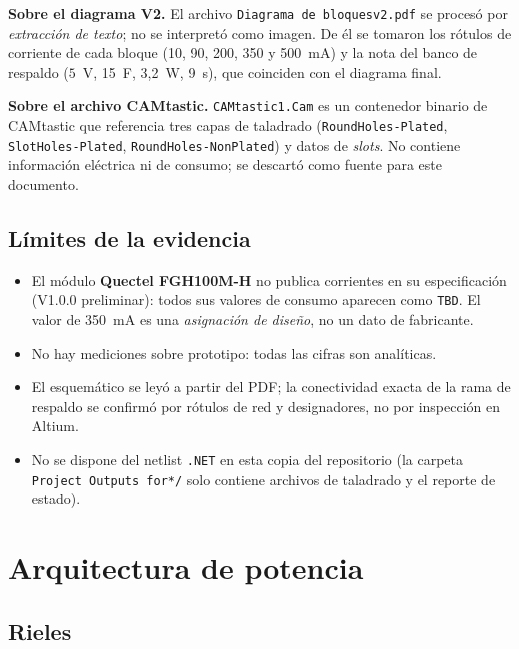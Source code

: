\documentclass[11pt,a4paper]{article}
\begin{document}
\noindent\textbf{Sobre el diagrama V2.} El archivo
\texttt{Diagrama de bloquesv2.pdf} se procesó por \emph{extracción de texto};
no se interpretó como imagen. De él se tomaron los rótulos de corriente de cada
bloque (10, 90, 200, 350 y 500~mA) y la nota del banco de respaldo
($5$~V, 15~F, 3,2~W, 9~s), que coinciden con el diagrama final.

\noindent\textbf{Sobre el archivo CAMtastic.} \texttt{CAMtastic1.Cam} es un
contenedor binario de CAMtastic que referencia tres capas de taladrado
(\texttt{RoundHoles-Plated}, \texttt{SlotHoles-Plated},
\texttt{RoundHoles-NonPlated}) y datos de \emph{slots}. No contiene
información eléctrica ni de consumo; se descartó como fuente para este
documento.

\subsection{Límites de la evidencia}

\begin{itemize}
  \item El módulo \textbf{Quectel FGH100M-H} no publica corrientes en su
        especificación (V1.0.0 preliminar): todos sus valores de consumo
        aparecen como \texttt{TBD}. El valor de 350~mA es una
        \emph{asignación de diseño}, no un dato de fabricante.
  \item No hay mediciones sobre prototipo: todas las cifras son analíticas.
  \item El esquemático se leyó a partir del PDF; la conectividad exacta de la
        rama de respaldo se confirmó por rótulos de red y designadores, no por
        inspección en Altium.
  \item No se dispone del netlist \texttt{.NET} en esta copia del repositorio
        (la carpeta \texttt{Project Outputs for*/} solo contiene archivos de
        taladrado y el reporte de estado).
\end{itemize}

\section{Arquitectura de potencia}
\label{sec:arquitectura}

\subsection{Rieles}
\end{document}
